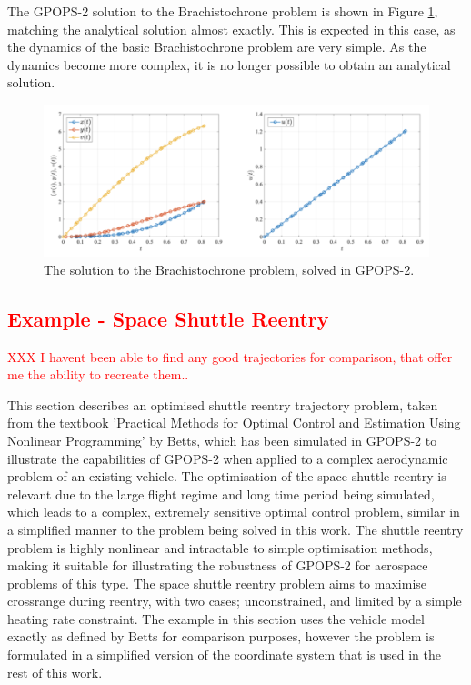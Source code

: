 The GPOPS-2 solution to the Brachistochrone problem is shown in Figure \ref{fig:Brachistochrone}, matching the analytical solution almost exactly. This is expected in this case, as the dynamics of the basic Brachistochrone problem are very simple. As the dynamics become more complex, it is no longer possible to obtain an analytical solution.  

\begin{figure}[ht]
	\centering
	\includegraphics[width=0.9\linewidth]{figures/4_LODESTAR/Brachistochrone}
	\caption{The solution to the Brachistochrone problem, solved in GPOPS-2\cite{Rao2010}.}
	\label{fig:Brachistochrone}
\end{figure}




\textcolor{red}{\section{Example - Space Shuttle Reentry}}
\textcolor{red}{XXX I havent been able to find any good trajectories for comparison, that offer me the ability to recreate them..}

This section describes an optimised shuttle reentry trajectory problem, taken from the textbook 'Practical Methods for Optimal Control and Estimation Using Nonlinear Programming' by Betts\cite{Betts2009}, which has been simulated in GPOPS-2 to illustrate the capabilities of GPOPS-2 when applied to a complex aerodynamic problem of an existing vehicle. The optimisation of the space shuttle reentry is relevant due to the large flight regime and long time period being simulated, which leads to a complex, extremely sensitive optimal control problem\cite{Betts2009}, similar in a simplified manner to the problem being solved in this work. The shuttle reentry problem is highly nonlinear and intractable to simple optimisation methods\cite{Betts2009}, making it suitable for illustrating the robustness of GPOPS-2 for aerospace problems of this type. 
The space shuttle reentry problem aims to maximise crossrange during reentry, with two cases; unconstrained, and limited by a simple heating rate constraint. The example in this section uses the vehicle model exactly as defined by Betts\cite{Betts2009} for comparison purposes, however the problem is formulated in a simplified version of the coordinate system that is used in the rest of this work. 


